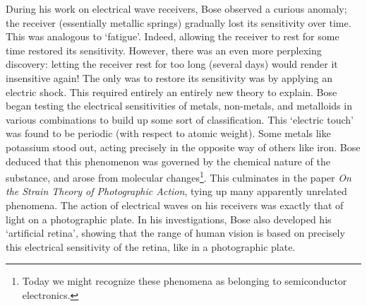 \documentclass[11pt]{article}
\theoremstyle{remark}
\begin{document}
    During his work on electrical wave receivers, Bose observed a curious anomaly;
    the receiver (essentially metallic springs) gradually lost its sensitivity over
    time. This was analogous to `fatigue'. Indeed, allowing the receiver to rest for
    some time restored its sensitivity. However, there was an even more perplexing
    discovery: letting the receiver rest for too long (several days) would render it
    insensitive again! The only was to restore its sensitivity was by applying an
    electric shock. This required entirely an entirely new theory to explain. Bose
    began testing the electrical sensitivities of metals, non-metals, and metalloids
    in various combinations to build up some sort of classification. This `electric
    touch' was found to be periodic (with respect to atomic weight). Some metals like
    potassium stood out, acting precisely in the opposite way of others like iron.
    Bose deduced that this phenomenon was governed by the chemical nature of the
    substance, and arose from molecular changes\footnote{Today we might recognize
    these phenomena as belonging to semiconductor electronics.}. This culminates in
    the paper \emph{On the Strain Theory of Photographic Action}, tying up many
    apparently unrelated phenomena. The action of electrical waves on his receivers
    was exactly that of light on a photographic plate. In his investigations, Bose
    also developed his `artificial retina', showing that the range of human vision is
    based on precisely this electrical sensitivity of the retina, like in a
    photographic plate.
\end{document}
